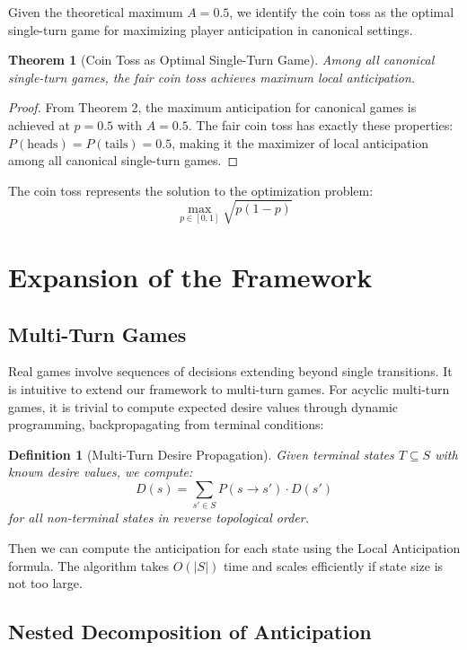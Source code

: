 \documentclass{article}
\newtheorem{definition}{Definition}
\newtheorem{theorem}{Theorem}
\begin{document}
Given the theoretical maximum $A = 0.5$, we identify the coin toss as the optimal single-turn game for maximizing player anticipation in canonical settings.

\begin{theorem}[Coin Toss as Optimal Single-Turn Game]
Among all canonical single-turn games, the fair coin toss achieves maximum local anticipation.
\end{theorem}

\begin{proof}
From Theorem 2, the maximum anticipation for canonical games is achieved at $p = 0.5$ with $A = 0.5$. The fair coin toss has exactly these properties: $P(\text{heads}) = P(\text{tails}) = 0.5$, making it the maximizer of local anticipation among all canonical single-turn games.
\end{proof}

The coin toss represents the solution to the optimization problem:
$$\max_{p \in [0,1]} \sqrt{p(1-p)}$$



\section{Expansion of the Framework}
\subsection{Multi-Turn Games}

Real games involve sequences of decisions extending beyond single transitions. It is intuitive to extend our framework to multi-turn games.
For acyclic multi-turn games, it is trivial to compute expected desire values through dynamic programming, backpropagating from terminal conditions:

\begin{definition}[Multi-Turn Desire Propagation]
Given terminal states $T \subseteq S$ with known desire values, we compute:
\begin{equation}
D(s) = \sum_{s' \in S} P(s \to s') \cdot D(s')
\end{equation}
for all non-terminal states in reverse topological order.
\end{definition}

Then we can compute the anticipation for each state using the Local Anticipation formula. The algorithm takes $O(|S|)$ time and scales efficiently if state size is not too large.

\subsection{Nested Decomposition of Anticipation}
\end{document}
